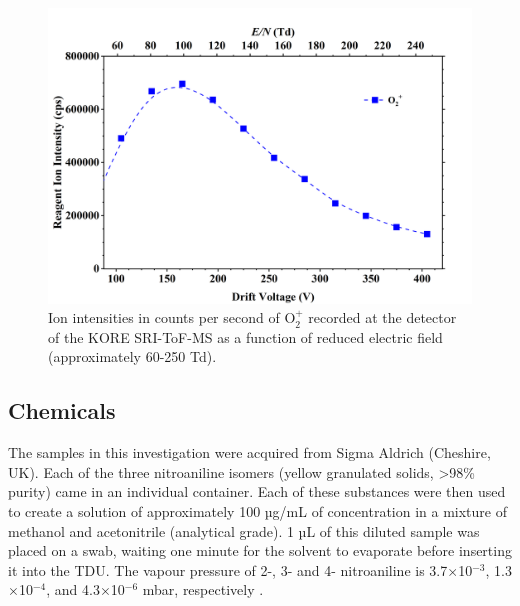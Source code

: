 \begin{figure}%
\centering
\includegraphics[height=0.35\textheight]{pics/nitros_paper_2.png}
\caption{Ion intensities in counts per second of O$_2^+$ recorded at the detector of the KORE SRI-ToF-MS as a function of reduced electric field (approximately 60-250 Td).}
\label{fig:na_fig2}
\end{figure}

\subsection{Chemicals}
The samples in this investigation were acquired from Sigma Aldrich (Cheshire, UK). Each of the three nitroaniline isomers (yellow granulated solids, >98\% purity) came in an individual container. 
Each of these substances were then used to create a solution of approximately 100 µg/mL of concentration in a mixture of methanol and acetonitrile (analytical grade).
1 µL of this diluted sample was placed on a swab, waiting one minute for the solvent to evaporate before inserting it into the TDU.
The vapour pressure of 2-, 3- and 4- nitroaniline is 3.7$\times$10$^{-3}$, 1.3$\times$10$^{-4}$, and 4.3$\times$10$^{-6}$ mbar, respectively \cite{2na,3na,4na}.




